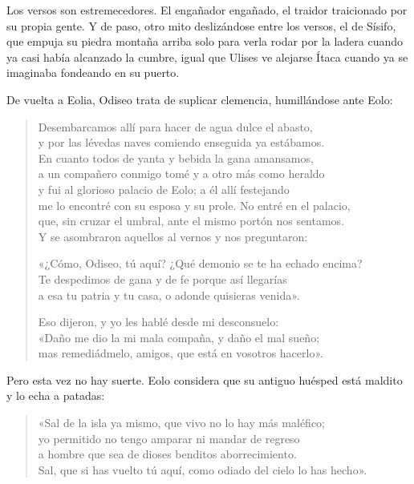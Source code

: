 Los versos son estremecedores. El engañador engañado, el traidor traicionado por su propia gente. Y de paso, otro mito deslizándose entre los versos, el de Sísifo, que empuja su piedra montaña arriba solo para verla rodar por la ladera cuando ya casi había alcanzado la cumbre, igual que Ulises ve alejarse Ítaca cuando ya se imaginaba fondeando en su puerto.

De vuelta a Eolia, Odiseo trata de suplicar clemencia, humillándose ante Eolo:

\begin{verse}
Desembarcamos allí para hacer de agua dulce el abasto,\\
y por las lévedas naves comiendo enseguida ya estábamos.\\
En cuanto todos de yanta y bebida la gana amansamos,\\
a un compañero conmigo tomé y a otro más como heraldo\\
y fui al glorioso palacio de Eolo; a él allí festejando\\
me lo encontré con su esposa y su prole. No entré en el palacio,\\
que, sin cruzar el umbral, ante el mismo portón nos sentamos.\\
Y se asombraron aquellos al vernos y nos preguntaron:

«¿Cómo, Odiseo, tú aquí? ¿Qué demonio se te ha echado encima?\\
Te despedimos de gana y de fe porque así llegarías\\
a esa tu patria y tu casa, o adonde quisieras venida».

Eso dijeron, y yo les hablé desde mi desconsuelo:\\
«Daño me dio la mi mala compaña, y daño el mal sueño;\\
mas remediádmelo, amigos, que está en vosotros hacerlo».
\end{verse}

Pero esta vez no hay suerte. Eolo considera que su antiguo huésped está maldito y lo echa a patadas:

\begin{verse}
«Sal de la isla ya mismo, que vivo no lo hay más maléfico;\\
yo permitido no tengo amparar ni mandar de regreso\\
a hombre que sea de dioses benditos aborrecimiento.\\
Sal, que si has vuelto tú aquí, como odiado del cielo lo has hecho».
\end{verse}


